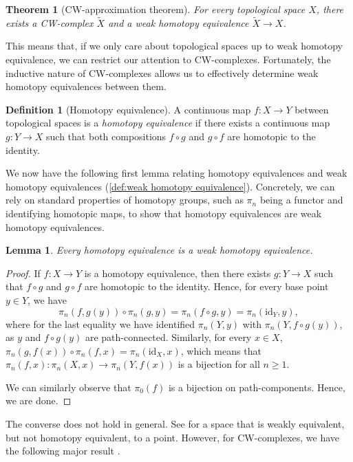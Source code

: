 \documentclass[11pt, a4paper]{amsart}
\newcommand{\id}{\mathrm{id}}
\newtheorem{theorem}[equation]{Theorem}
\newtheorem{lemma}[equation]{Lemma}
\theoremstyle{definition}
\newtheorem{definition}[equation]{Definition}
\theoremstyle{remark}
\numberwithin{equation}{section}
\begin{document}
\begin{theorem}[CW-approximation theorem]
  For every topological space $X$, there exists a CW-complex $\tilde{X}$ and a weak homotopy equivalence $\tilde{X} \to X$.
\end{theorem}

This means that, if we only care about topological spaces up to weak homotopy equivalence, we can restrict our attention to CW-complexes. Fortunately, the inductive nature of CW-complexes allows us to effectively determine weak homotopy equivalences between them.

\begin{definition}[Homotopy equivalence]
  A continuous map $f\colon X \to Y$ between topological spaces is a \emph{homotopy equivalence} if there exists a continuous map $g\colon Y \to X$ such that both compositions $f \circ g$ and $g \circ f$ are homotopic to the identity.
\end{definition}

We now have the following first lemma relating homotopy equivalences and weak homotopy equivalences (\cref{def:weak homotopy equivalence}). Concretely, we can rely on standard properties of homotopy groups, such as $\pi_n$ being a functor and identifying homotopic maps, to show that homotopy equivalences are weak homotopy equivalences.

\begin{lemma} \label{lemma:homotopy implies weak homotopy}
  Every homotopy equivalence is a weak homotopy equivalence.
\end{lemma}

\begin{proof}
 If $f\colon X \to Y$ is a homotopy equivalence, then there exists $g\colon Y \to X$ such that $f \circ g$ and $g \circ f$ are homotopic to the identity. Hence, for every base point $y \in Y$, we have 
 \[\pi_n(f,g(y)) \circ \pi_n(g,y) = \pi_n(f \circ g,y) = \pi_n(\id_Y,y),\] 
 where for the last equality we have identified $\pi_n(Y,y)$ with $\pi_n(Y,f \circ g(y))$, as $y$ and $f \circ g(y)$ are path-connected. Similarly, for every $x \in X$, $\pi_n(g,f(x)) \circ \pi_n(f,x) = \pi_n(\id_X,x)$, which means that $\pi_n(f,x)\colon \pi_n(X,x) \to \pi_n(Y,f(x))$ is a bijection for all $n \geq 1$.

 We can similarly observe that $\pi_0(f)$ is a bijection on path-components. Hence, we are done.
\end{proof}

The converse does not hold in general. See \cite[Exercise 1.3.7]{hatcher2002at} for a space that is weakly equivalent, but not homotopy equivalent, to a point. However, for CW-complexes, we have the following major result \cite[Theorem 4.5]{hatcher2002at}.
\end{document}
